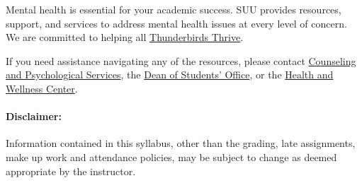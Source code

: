 \documentclass[12pt, letterpaper]{article}
\begin{document}
\noindent
Mental health is essential for your academic success. SUU provides resources, support, and services to address mental health issues at every level of concern. We are committed to helping all \href{https://www.suu.edu/mentalhealth/}{Thunderbirds Thrive}. 

\noindent
If you need assistance navigating any of the resources, please contact \href{https://www.suu.edu/caps/}{Counseling and Psychological Services}, the \href{https://www.suu.edu/deanofstudents/}{Dean of Students’ Office}, or the \href{https://www.suu.edu/health/}{Health and Wellness Center}.

\paragraph{Disclaimer:}
Information contained in this syllabus, other than the grading, late assignments, make up work and attendance policies, may be subject to change as deemed appropriate by the instructor.
\end{document}
